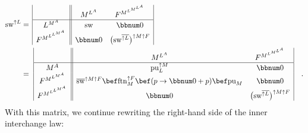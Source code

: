 \begin{align*}
\text{sw}^{\uparrow L} & =\,\begin{array}{|c||cc|}
 & M^{L^{A}} & F^{M^{L^{M^{L^{A}}}}}\\
\hline L^{M^{A}} & \text{sw} & \bbnum 0\\
F^{M^{L^{L^{M^{A}}}}} & \bbnum 0 & \big(\text{sw}^{\overline{\uparrow L}}\big)^{\uparrow M\uparrow F}
\end{array}\\
 & =\,\,\begin{array}{|c||cc|}
 & M^{L^{A}} & F^{M^{L^{M^{L^{A}}}}}\\
\hline M^{A} & \text{pu}_{L}^{\uparrow M} & \bbnum 0\\
F^{M^{L^{M^{A}}}} & \overline{\text{sw}}^{\uparrow M\uparrow F}\bef\text{ftn}_{M}^{\uparrow F}\bef(p\rightarrow\bbnum 0+p)\bef\text{pu}_{M} & \bbnum 0\\
F^{M^{L^{L^{M^{A}}}}} & \bbnum 0 & \big(\text{sw}^{\overline{\uparrow L}}\big)^{\uparrow M\uparrow F}
\end{array}\quad.
\end{align*}
With this matrix, we continue rewriting the right-hand side of the
inner interchange law:
